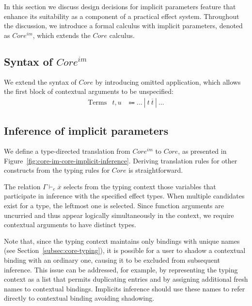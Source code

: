 \documentclass[acmsmall,review,screen]{acmart}
\newcommand{\vor}{~|~}
\newcommand{\ap}{~}
\begin{document}
In this section we discuss design decisions for implicit parameters feature that enhance its suitability as a component of a practical effect system.
Throughout the discussion, we introduce a formal calculus with implicit parameters, denoted as $Core^{im}$, which extends the $Core$ calculus.

\subsection{Syntax of $Core^{im}$}

We extend the syntax of $Core$ by introducing omitted application, which allows the first block of contextual arguments to be unspecified:
\[
    \begin{array}{lcc}
        \text{Terms} & t, u &\Coloneqq \ldots \vor t\ap\overline{t} \vor \ldots
    \end{array}
\]

\subsection{Inference of implicit parameters} \label{subsec:inference}

We define a type-directed translation from $Core^{im}$ to $Core$, as presented in Figure~\ref{fig:core-im-core-implicit-inference}.
Deriving translation rules for other constructs from the typing rules for $Core$ is straightforward.

The relation $\Gamma\vdash_e \overline{x}$ selects from the typing context those variables that participate in inference with the specified effect types.
When multiple candidates exist for a type, the leftmost one is selected.
Since function arguments are uncurried and thus appear logically simultaneously in the context, we require contextual arguments to have distinct types.

Note that, since the typing context maintains only bindings with unique names (see Section\ \ref{subsec:core-typing}), it is possible for a user to shadow a contextual binding with an ordinary one, causing it to be excluded from subsequent inference.
This issue can be addressed, for example, by representing the typing context as a list that permits duplicating entries and by assigning additional fresh names to contextual bindings.
Implicits inference should use these names to refer directly to contextual binding avoiding shadowing.
\end{document}
